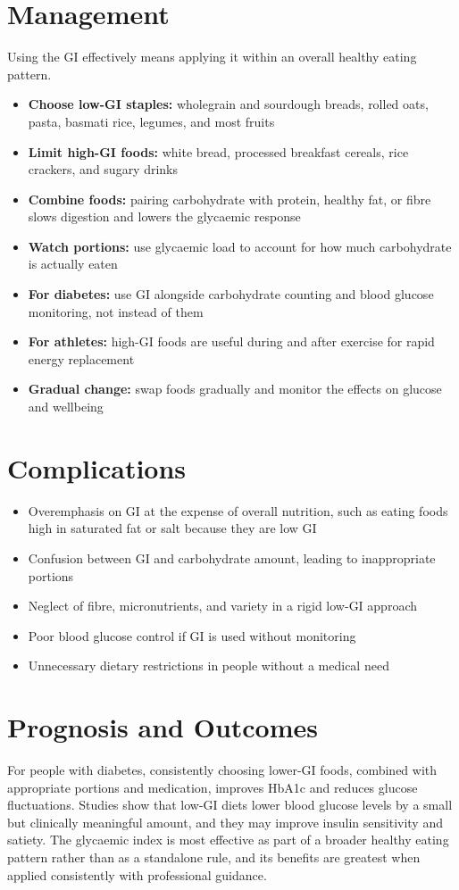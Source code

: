 \section*{Management}
Using the GI effectively means applying it within an overall healthy eating pattern.

\begin{itemize}
    \item \textbf{Choose low-GI staples:} wholegrain and sourdough breads, rolled oats, pasta, basmati rice, legumes, and most fruits
    \item \textbf{Limit high-GI foods:} white bread, processed breakfast cereals, rice crackers, and sugary drinks
    \item \textbf{Combine foods:} pairing carbohydrate with protein, healthy fat, or fibre slows digestion and lowers the glycaemic response
    \item \textbf{Watch portions:} use glycaemic load to account for how much carbohydrate is actually eaten
    \item \textbf{For diabetes:} use GI alongside carbohydrate counting and blood glucose monitoring, not instead of them
    \item \textbf{For athletes:} high-GI foods are useful during and after exercise for rapid energy replacement
    \item \textbf{Gradual change:} swap foods gradually and monitor the effects on glucose and wellbeing
\end{itemize}

\section*{Complications}
\begin{itemize}
    \item Overemphasis on GI at the expense of overall nutrition, such as eating foods high in saturated fat or salt because they are low GI
    \item Confusion between GI and carbohydrate amount, leading to inappropriate portions
    \item Neglect of fibre, micronutrients, and variety in a rigid low-GI approach
    \item Poor blood glucose control if GI is used without monitoring
    \item Unnecessary dietary restrictions in people without a medical need
\end{itemize}

\section*{Prognosis and Outcomes}
For people with diabetes, consistently choosing lower-GI foods, combined with appropriate portions and medication, improves HbA1c and reduces glucose fluctuations. Studies show that low-GI diets lower blood glucose levels by a small but clinically meaningful amount, and they may improve insulin sensitivity and satiety. The glycaemic index is most effective as part of a broader healthy eating pattern rather than as a standalone rule, and its benefits are greatest when applied consistently with professional guidance.

